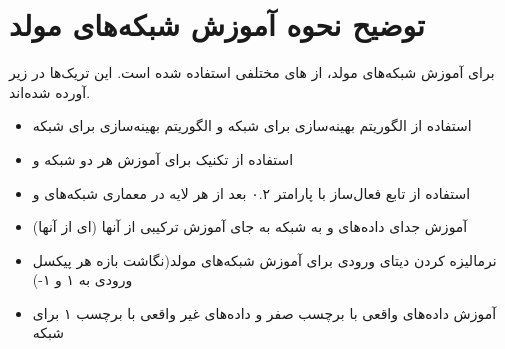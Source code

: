 \documentclass{article}
\begin{document}
\section{توضیح نحوه آموزش شبکه‌های مولد}
برای آموزش ‌شبکه‌های مولد، از ‌های مختلفی استفاده شده است. این تریک‌ها در زیر آورده شده‌اند.  
\begin{itemize}
	\item استفاده از الگوریتم بهینه‌سازی  برای شبکه  و الگوریتم بهینه‌سازی  برای شبکه 
	\item استفاده از تکنیک  برای آموزش هر دو شبکه  و 
	\item استفاده از تابع فعال‌ساز  با پارامتر ۰.۲ بعد از هر لایه در معماری شبکه‌های  و 
	\item آموزش جدای داده‌های و  به شبکه  به جای آموزش ترکیبی از آنها (ای از آنها)
	\item نرمالیزه کردن دیتای ورودی برای آموزش شبکه‌های مولد(نگاشت بازه هر پیکسل  ورودی به ۱ و ۱-)
	\item آموزش داده‌های واقعی با برچسب صفر و داده‌های غیر واقعی با برچسب ۱ برای شبکه  
\end{itemize}
\end{document}
